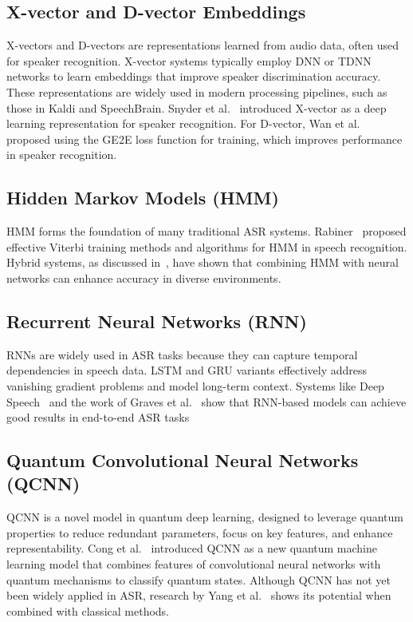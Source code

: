 \documentclass[conference]{IEEEtran}
\begin{document}
\subsection{X-vector and D-vector Embeddings}

X-vectors and D-vectors are representations learned from audio data, often used for speaker recognition. X-vector systems typically employ DNN or TDNN networks to learn embeddings that improve speaker discrimination accuracy. These representations are widely used in modern processing pipelines, such as those in Kaldi and SpeechBrain. Snyder et al.~\cite{Snyder2018Xvectors} introduced X-vector as a deep learning representation for speaker recognition. For D-vector, Wan et al.~\cite{Wan2018Generalized} proposed using the GE2E loss function for training, which improves performance in speaker recognition.

\subsection{Hidden Markov Models (HMM)}

HMM forms the foundation of many traditional ASR systems. Rabiner~\cite{rabiner1989tutorial} proposed effective Viterbi training methods and algorithms for HMM in speech recognition. Hybrid systems, as discussed in~\cite{voll2007hybrid, perero2022comparison}, have shown that combining HMM with neural networks can enhance accuracy in diverse environments.

\subsection{Recurrent Neural Networks (RNN)}

RNNs are widely used in ASR tasks because they can capture temporal dependencies in speech data. LSTM and GRU variants effectively address vanishing gradient problems and model long-term context. Systems like Deep Speech~\cite{hannun2014deep} and the work of Graves et al.~\cite{graves2013speech} show that RNN-based models can achieve good results in end-to-end ASR tasks

\subsection{Quantum Convolutional Neural Networks (QCNN)}

QCNN is a novel model in quantum deep learning, designed to leverage quantum properties to reduce redundant parameters, focus on key features, and enhance representability. Cong et al.~\cite{Cong2019QuantumCNN} introduced QCNN as a new quantum machine learning model that combines features of convolutional neural networks with quantum mechanisms to classify quantum states. Although QCNN has not yet been widely applied in ASR, research by Yang et al.~\cite{Yang2021Decentralizing} shows its potential when combined with classical methods.
\end{document}
